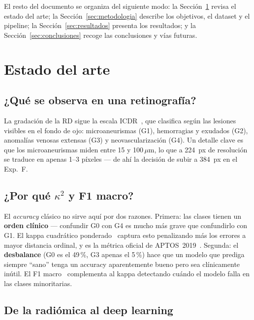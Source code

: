 \documentclass[12pt, a4paper]{article}
\begin{document}
El resto del documento se organiza del siguiente modo: la Sección~\ref{sec:arte}
revisa el estado del arte; la Sección~\ref{sec:metodologia} describe los objetivos,
el dataset y el pipeline; la Sección~\ref{sec:resultados} presenta los resultados;
y la Sección~\ref{sec:conclusiones} recoge las conclusiones y vías futuras.

\newpage

\newpage
\section{Estado del arte}
\label{sec:arte}

\subsection{¿Qué se observa en una retinografía?}

La gradación de la RD sigue la escala ICDR~\cite{wilkinson2003icdr}, que
clasifica según las lesiones visibles en el fondo de ojo: microaneurismas
(G1), hemorragias y exudados (G2), anomalías venosas extensas (G3) y
neovascularización (G4). Un detalle clave es que los microaneurismas miden
entre 15 y 100\,$\mu$m, lo que a 224~px de resolución se traduce en apenas
1--3 píxeles --- de ahí la decisión de subir a 384~px en el Exp.~F.

\subsection{¿Por qué $\kappa^2$ y F1 macro?}

El \textit{accuracy} clásico no sirve aquí por dos razones. Primera: las
clases tienen un \textbf{orden clínico} --- confundir G0 con G4 es mucho
más grave que confundirlo con G1. El kappa cuadrático
ponderado~\cite{cohen1968weightedkappa} captura esto penalizando más los
errores a mayor distancia ordinal, y es la métrica oficial de
APTOS~2019~\cite{aptos2019}. Segunda: el \textbf{desbalance} (G0 es el
49\,\%, G3 apenas el 5\,\%) hace que un modelo que prediga siempre ``sano''
tenga un accuracy aparentemente bueno pero sea clínicamente inútil. El
F1 macro~\cite{sokolova2009metrics} complementa al kappa detectando
cuándo el modelo falla en las clases minoritarias.

\subsection{De la radiómica al deep learning}
\end{document}
